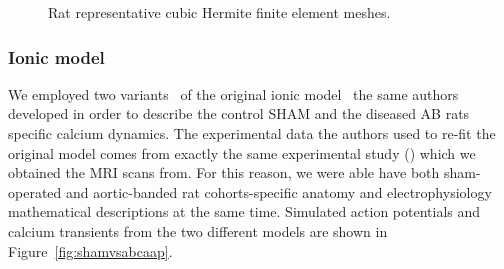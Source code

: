 \begin{figure}[!ht]
    \myfloatalign
    \quad
    \caption{Rat representative cubic Hermite finite element meshes.}
    \label{fig:ratrepgeom}
\end{figure}


%
%
%
\subsubsection{Ionic model}\label{sec:ch4ionicmodel}
We employed two variants~\cite{Gattoni:2017} of the original ionic model~\cite{Gattoni:2016} the same authors developed in order to describe the control SHAM and the diseased AB rats specific calcium dynamics. The experimental data the authors used to re-fit the original model comes from exactly the same experimental study (\cite{Roe:2017}) which we obtained the MRI scans from. For this reason, we were able have both sham-operated and aortic-banded rat cohorts-specific anatomy and electrophysiology mathematical descriptions at the same time. Simulated action potentials and calcium transients from the two different models are shown in Figure~\ref{fig:shamvsabcaap}.

